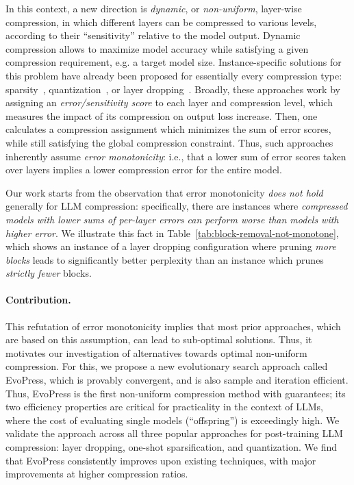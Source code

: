 \documentclass{article}
\theoremstyle{plain}
\theoremstyle{definition}
\theoremstyle{remark}
\newcommand{\methodname}{EvoPress}
\begin{document}
In this context, a new direction is \emph{dynamic}, or \emph{non-uniform}, layer-wise compression, in which different layers can be compressed to various levels, according to their ``sensitivity'' relative to the model output. Dynamic compression allows to maximize model accuracy while satisfying a given compression requirement, e.g. a target model size. Instance-specific solutions for this problem have already been proposed for essentially every compression type: sparsity~\cite{owl}, quantization~\cite{frantar2022spdy}, or layer dropping~\cite{shortened_llama, shortgpt}. 
Broadly, these approaches work by assigning an \emph{error/sensitivity score} to each layer and compression level, which measures the impact of its compression on output loss increase.  
Then, one calculates a compression assignment which minimizes the sum of error scores, while still satisfying the global compression constraint. 
Thus, such approaches inherently assume \emph{error monotonicity}: i.e., that a lower sum of error scores taken over layers implies a lower compression error for the entire model. 

Our work starts from the observation that error monotonicity \emph{does not hold} generally for LLM compression: specifically, there are instances where \emph{compressed models with lower sums of per-layer errors can perform \emph{worse} than models with higher error}. We illustrate this fact in Table~\ref{tab:block-removal-not-monotone}, which shows an instance of a layer dropping configuration where pruning \emph{more blocks} leads to significantly better perplexity than an instance which prunes \emph{strictly fewer} blocks. 

\paragraph{Contribution.} This refutation of error monotonicity implies that most prior approaches, which are based on this assumption, can lead to sub-optimal solutions. 
Thus, it motivates our investigation of alternatives towards optimal non-uniform compression. For this, we propose a new evolutionary search approach called \methodname{}, which is provably convergent, and is also sample and iteration efficient. Thus, \methodname{} is the first non-uniform compression method with guarantees; its two efficiency properties are critical for practicality in the context of LLMs, where the cost of evaluating single models (``offspring'') is exceedingly high. 
We validate the approach across all three popular approaches for post-training LLM compression: layer dropping, one-shot sparsification, and quantization. 
We find that \methodname{} consistently improves upon existing techniques, with major improvements at higher compression ratios. 
\end{document}
